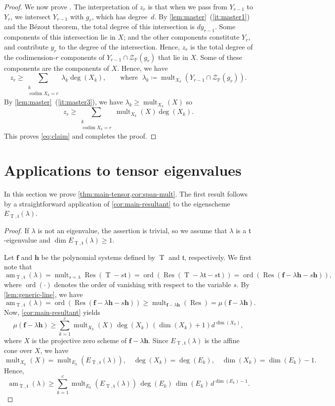 \documentclass[11pt,letterpaper]{article}
\numberwithin{equation}{section}
\newcommand{\PP}{\mathbb{P}}
\newcommand{\cZ}{\mathcal{Z}}
\newcommand{\ff}{\ensuremath{\boldsymbol{f}}}
\newcommand{\hh}{\ensuremath{\boldsymbol{h}}}
\newcommand{\ft}{\mathfrak{t}}
\DeclareMathOperator{\codim}{codim}
\DeclareMathOperator{\am}{am}
\DeclareMathOperator{\Res}{Res}
\DeclareMathOperator{\T}{T}
\DeclareMathOperator{\mult}{mult}
\begin{document}
\begin{proof}
    We now prove .
    The interpretation of $z_r$ is that when we pass from $Y_{r-1}$ to $Y_{r}$, we intersect $Y_{r-1}$ with $g_r$, which has degree~$d$.
    By \cref{lem:master}~(\ref{it:master1}) and the B\'{e}zout theorem, the total degree of this intersection is $d y_{r-1}$.
    Some components of this intersection lie in $X$; and the other components constitute $Y_{r}$, and contribute $y_r$ to the degree of the intersection.
    Hence, $z_r$ is the total degree of the codimension-$r$ components of $Y_{r-1}\cap\cZ_{\PP}(g_r)$ that lie in $X$.
    Some of these components are the components of $X$.
   Hence, we have \[
    z_r \geq \sum_{\substack{k\\ \codim X_k=r}} \lambda_k \deg(X_k),\qquad \text{where }\;  \lambda_k \coloneqq \mult_{X_k}(Y_{r-1}\cap \cZ_{\PP}(g_r)). 
    \] 
    By \cref{lem:master}~(\ref{it:master3}), we have $\lambda_k\geq \mult_{X_k}(X)$ so \[
    z_r \geq \sum_{\substack{k\\ \codim X_k=r}} \mult_{X_k}(X) \deg(X_k).
    \]
    This proves \cref{eq:claim} and completes the proof.
\end{proof}

\section{Applications to tensor eigenvalues}
\label{sec:eigenvalues}

In this section we prove \cref{thm:main-tensor,cor:span-mult}.
The first result follows by a straightforward application of \cref{cor:main-resultant} to the eigenscheme $E_{\T,\ft}(\lambda)$.

\eigenvalue*
\begin{proof}
If $\lambda$ is not an eigenvalue, the assertion is trivial, so we assume that $\lambda$ is a $\ft$-eigenvalue and $\dim E_{\T,\ft}(\lambda)\geq 1$. 

Let $\ff$ and $\hh$ be the polynomial systems defined by $\T$ and $\ft$, respectively.
We first note that \[
\am_{\T,\ft}(\lambda) = \mult_{s=\lambda} \Res(\T-s\ft) = \operatorname{ord}\left( \Res(\T-\lambda\ft - s\ft)\right) = \operatorname{ord}\left( \Res(\ff-\lambda\hh - s\hh)\right),
\] where $\operatorname{ord}(\cdot)$ denotes the order of vanishing with respect to the variable $s$.
By \cref{lem:generic-line}, we have \[
\am_{\T,\ft}(\lambda)=\operatorname{ord}(\Res(\ff-\lambda\hh-s\hh))\geq\mult_{\ff-\lambda\hh}(\Res) = \mu(\ff-\lambda\hh).
\] Now, \cref{cor:main-resultant} yields \[
\mu(\ff-\lambda \hh) \geq \sum_{k=1}^c \mult_{X_k}(X) \, \deg(X_k) \, \left(\dim(X_k)+1\right)d^{\dim(X_k)},
\] where $X$ is the projective zero scheme of $\ff-\lambda \hh$.
Since $E_{\T,\ft}(\lambda)$ is the affine cone over $X$, we have \[
\mult_{X_k}(X) = \mult_{E_k}(E_{\T,\ft}(\lambda)),\quad \deg(X_k)=\deg(E_k),\quad \dim(X_k)=\dim(E_k)-1.
\] 
Hence, \[
\am_{\T,\ft}(\lambda) \geq \sum_{k=1}^c \mult_{E_k}(E_{\T,\ft}(\lambda))\, \deg(E_k)\, \dim(E_k)\, d^{\dim(E_k)-1}. 
\]
\end{proof}
\end{document}
